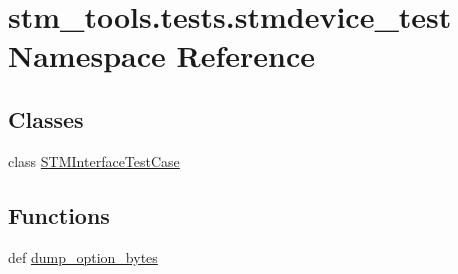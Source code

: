 \hypertarget{namespacestm__tools_1_1tests_1_1stmdevice__test}{}\section{stm\+\_\+tools.\+tests.\+stmdevice\+\_\+test Namespace Reference}
\label{namespacestm__tools_1_1tests_1_1stmdevice__test}
\subsection*{Classes}
\begin{DoxyCompactItemize}
\item 
class \hyperlink{classstm__tools_1_1tests_1_1stmdevice__test_1_1STMInterfaceTestCase}{S\+T\+M\+Interface\+Test\+Case}
\end{DoxyCompactItemize}
\subsection*{Functions}
\begin{DoxyCompactItemize}
\item 
def \hyperlink{namespacestm__tools_1_1tests_1_1stmdevice__test_a29847c5bc228bd343723ecd1954d48d3}{dump\+\_\+option\+\_\+bytes}
\end{DoxyCompactItemize}
